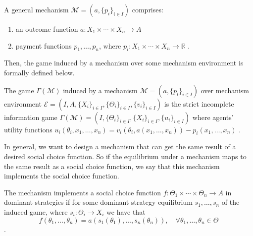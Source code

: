 \documentclass[11pt]{phdthesis}
\begin{document}
\begin{definition} [mechanism]\label{general mechanism}
	A general mechanism $ \mathcal{M} = (a, \{p_i\}_{i \in I}) $ comprises:
	\begin{enumerate}
		\item an outcome function $a : X_1 \times \cdots \times X_n \rightarrow A $
		\item payment functions $p_1,\ldots,p_n$, where $p_i : X_1 \times \cdots \times X_n \rightarrow \mathbb{R}$
		\citep[Definition 9.24]{nisan2007algorithmic}.
	\end{enumerate}
\end{definition}

Then, the game induced by a mechanism over some mechanism environment is formally defined below.
\begin{definition}
	The game $ \Gamma(\mathcal{M}) $ induced by a mechanism $ \mathcal{M} = (a, \{p_i\}_{i \in I}) $ over mechanism environment $ \mathcal{E} = (I, A, \{X_i\}_{i \in I}, \{\Theta_{i}\}_{i \in I}, \{v_i\}_{i \in I}) $ is the strict incomplete information game $ \Gamma(\mathcal{M}) = (I, \{\Theta_{i}\}_{i \in I}, \{X_i\}_{i \in I}, \{u_i\}_{i \in I}) $ where
	agents' utility functions $u_i(\theta_i,x_1,\ldots,x_n) = v_i(\theta_i,a(x_1,\ldots,x_n)) - p_i(x_1,\ldots,x_n)$
	\citep[Definition 9.24]{nisan2007algorithmic}.
\end{definition}

In general, we want to design a mechanism that can get the same result of a desired social choice function. So if the equilibrium under a mechanism maps to the same result as a social choice function, we say that this mechanism implements the social choice function.

\begin{definition}[implementation]
	The mechanism implements a social choice function $f : \Theta_1 \times \cdots \times \Theta_n \rightarrow A$ in dominant strategies if for some dominant strategy equilibrium $s_1,\ldots,s_n$ of the induced game, where $s_i: \Theta_i \rightarrow X_i$ we have that
	$$ f(\theta_1,\ldots,\theta_n) = a(s_1(\theta_1),\ldots,s_n(\theta_n)), \quad \forall \theta_1,\ldots,\theta_n \in \Theta $$
	\citep[Definition 9.24]{nisan2007algorithmic}.
\end{definition}
\end{document}
